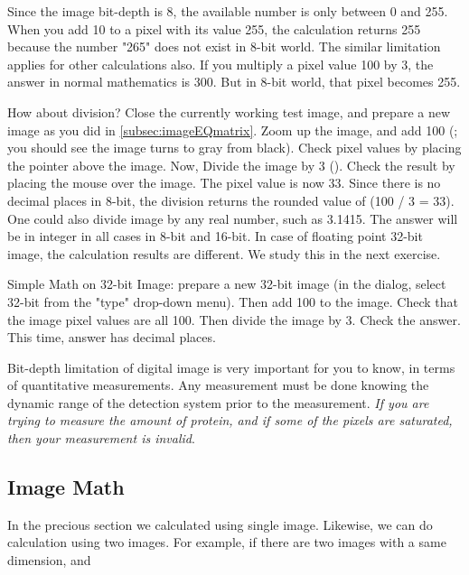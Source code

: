 \begin{indentexercise}{1}
Since the image bit-depth is 8, the available number is only between 0
and 255. When you add 10 to a pixel with its value 255, the calculation
returns 255 because the number
"265" does not exist in 8-bit
world. The similar limitation applies for other calculations also. If
you multiply a pixel value 100 by 3, the answer in normal mathematics
is 300. But in 8-bit world, that pixel becomes 255. 

How about division? Close the currently working test image, and prepare
a new image as you did in \ref{subsec:imageEQmatrix}. Zoom up the image, and add 100
(; you
should see the image turns to gray from black). Check pixel values by
placing the pointer above the image. Now, Divide the image by 3
().
Check the result by placing the mouse over the image. The pixel value
is now 33. Since there is no decimal places in 8-bit, the division
returns the rounded value of (100 / 3 = 33). One could also divide
image by any real number, such as 3.1415. The answer will be in integer
in all cases in 8-bit and 16-bit. In case of floating point 32-bit
image, the calculation results are different. We study this in the next
exercise. 
\end{indentexercise}

\begin{indentexercise}{2}
Simple Math on 32-bit Image: prepare a new
32-bit image (in the  dialog,
select 32-bit from the "type"
drop-down menu). Then add 100 to the image. Check that the image pixel
values are all 100. Then divide the image by 3. Check the answer. This
time, answer has decimal places. 
\end{indentexercise}

Bit-depth limitation of digital image is very important for you to know,
in terms of quantitative measurements. Any measurement must be done
knowing the dynamic range of the detection system prior to the
measurement. \textit{If you are trying to measure the amount of
protein, and if some of the pixels are saturated, then your measurement
is invalid}. 

\subsection{Image Math }

In the precious section we calculated using single image. Likewise, we
can do calculation using two images. For example, if there are two
images with a same dimension, and 

